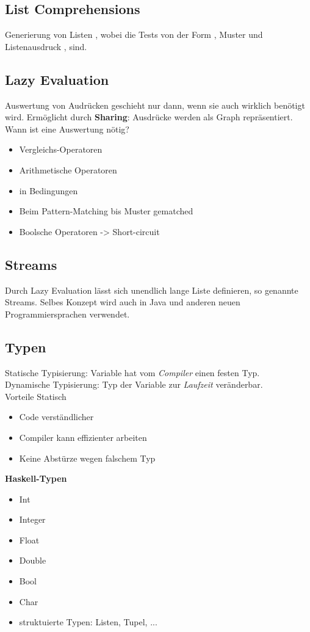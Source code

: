 \subsection{List Comprehensions}%
\label{hsk:sub:list-comprehensions}
Generierung von Listen \code{\([e | q_1, ..., q_m]\)}, wobei die  Tests von der Form
, Muster  und Listenausdruck , sind.

\subsection{Lazy Evaluation}%
\label{hsk:sub:lazy-evaluation}
Auswertung von Audrücken geschieht nur dann, wenn sie auch wirklich benötigt wird. Ermöglicht durch \textbf{Sharing}:
Ausdrücke werden als Graph repräsentiert.\\
Wann ist eine Auswertung nötig?
\begin{itemize}
  \item Vergleichs-Operatoren
  \item Arithmetische Operatoren
  \item in Bedingungen
  \item Beim Pattern-Matching bis Muster gematched
  \item Boolsche Operatoren -> Short-circuit
\end{itemize}

\subsection{Streams}%
\label{hsk:sub:streams}
Durch Lazy Evaluation lässt sich unendlich lange Liste definieren, so genannte Streams.
Selbes Konzept wird auch in Java und anderen neuen Programmiersprachen verwendet.

\subsection{Typen}%
\label{hsk:sub:typen}
Statische Typisierung: Variable hat vom \textit{Compiler} einen festen Typ.\\
Dynamische Typisierung: Typ der Variable zur \textit{Laufzeit} veränderbar.\\
Vorteile Statisch
\begin{itemize}
  \item Code verständlicher
  \item Compiler kann effizienter arbeiten
  \item Keine Abstürze wegen falschem Typ
\end{itemize}
\textbf{Haskell-Typen}
\begin{itemize}
  \item Int
  \item Integer
  \item Float
  \item Double
  \item Bool
  \item Char
  \item struktuierte Typen: Listen, Tupel, ...
\end{itemize}

